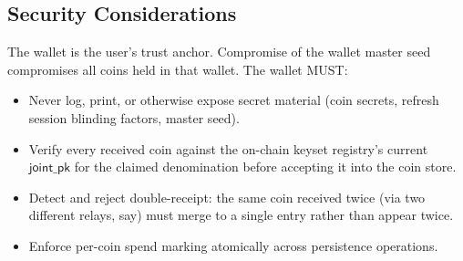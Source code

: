 \subsection{Security Considerations}
\label{sec:wallet-security}

The wallet is the user's trust anchor. Compromise of the wallet master seed compromises all coins held in that wallet. The wallet MUST:

\begin{itemize}[leftmargin=2em,itemsep=0pt]
  \item Never log, print, or otherwise expose secret material (coin secrets, refresh session blinding factors, master seed).
  \item Verify every received coin against the on-chain keyset registry's current $\mathsf{joint\_pk}$ for the claimed denomination before accepting it into the coin store.
  \item Detect and reject double-receipt: the same coin received twice (via two different relays, say) must merge to a single entry rather than appear twice.
  \item Enforce per-coin spend marking atomically across persistence operations.
\end{itemize}

